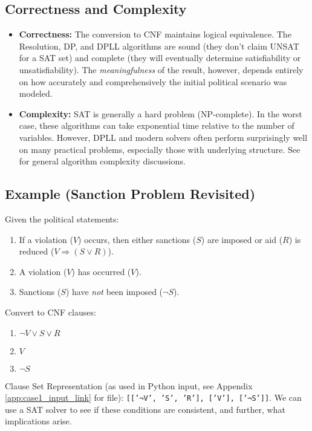 \documentclass[11pt, a4paper]{article}
\begin{document}
\subsection*{Correctness and Complexity}

\begin{itemize}
    \item \textbf{Correctness:} The conversion to CNF maintains logical equivalence. The Resolution, DP, and DPLL algorithms are sound (they don't claim UNSAT for a SAT set) and complete (they will eventually determine satisfiability or unsatisfiability). The \textit{meaningfulness} of the result, however, depends entirely on how accurately and comprehensively the initial political scenario was modeled.
    \item \textbf{Complexity:} SAT is generally a hard problem (NP-complete). In the worst case, these algorithms can take exponential time relative to the number of variables. However, DPLL and modern solvers often perform surprisingly well on many practical problems, especially those with underlying structure. See \cite{Cormen1996} for general algorithm complexity discussions.
\end{itemize}

\subsection*{Example (Sanction Problem Revisited)}
Given the political statements:
\begin{enumerate}
    \item If a violation ($V$) occurs, then either sanctions ($S$) are imposed or aid ($R$) is reduced ($V \Rightarrow (S \vee R)$).
    \item A violation ($V$) has occurred ($V$).
    \item Sanctions ($S$) have \textit{not} been imposed ($\neg S$).
\end{enumerate}

Convert to CNF clauses:
\begin{enumerate}
    \item $\neg V \vee S \vee R$
    \item $V$
    \item $\neg S$
\end{enumerate}

Clause Set Representation (as used in Python input, see Appendix \ref{app:case1_input_link} for file): \texttt{[['¬V', 'S', 'R'], ['V'], ['¬S']]}. We can use a SAT solver to see if these conditions are consistent, and further, what implications arise.
\end{document}
